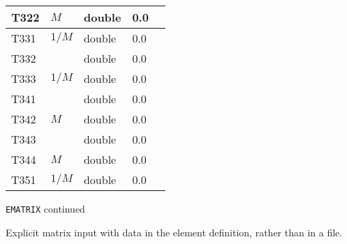 \begin{tabular}{|l|l|l|l|p{\descwidth}|}
T322 & $M$ & double &  0.0 & \\ \hline 
T331 & $1/M$ & double &  0.0 & \\ \hline 
T332 &  & double &  0.0 & \\ \hline 
T333 & $1/M$ & double &  0.0 & \\ \hline 
T341 &  & double &  0.0 & \\ \hline 
T342 & $M$ & double &  0.0 & \\ \hline 
T343 &  & double &  0.0 & \\ \hline 
T344 & $M$ & double &  0.0 & \\ \hline 
T351 & $1/M$ & double &  0.0 & \\ \hline 
\end{tabular}

\newpage
\begin{center}{\Large\verb|EMATRIX| continued}\end{center}
Explicit matrix input with data in the element definition, rather than in a file.
\\
